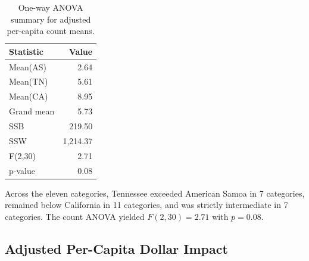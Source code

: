 \begin{table}[H]
  \centering
  \caption{One-way ANOVA summary for adjusted per-capita count means.}
  \label{tab:anova-count-summary}
  \begin{tabular}{@{}lr@{}}
    \toprule
    Statistic & Value\\
    \midrule
    Mean(AS) & 2.64\\
    Mean(TN) & 5.61\\
    Mean(CA) & 8.95\\
    Grand mean & 5.73\\
    SSB & 219.50\\
    SSW & 1{,}214.37\\
    F(2,30) & 2.71\\
    p-value & 0.08\\
    \bottomrule
  \end{tabular}
\end{table}

Across the eleven categories, Tennessee exceeded American Samoa in 7 categories, remained below California in 11 categories, and was strictly intermediate in 7 categories. The count ANOVA yielded $F(2,30)=2.71$ with $p=0.08$.

\subsection{Adjusted Per-Capita Dollar Impact}

